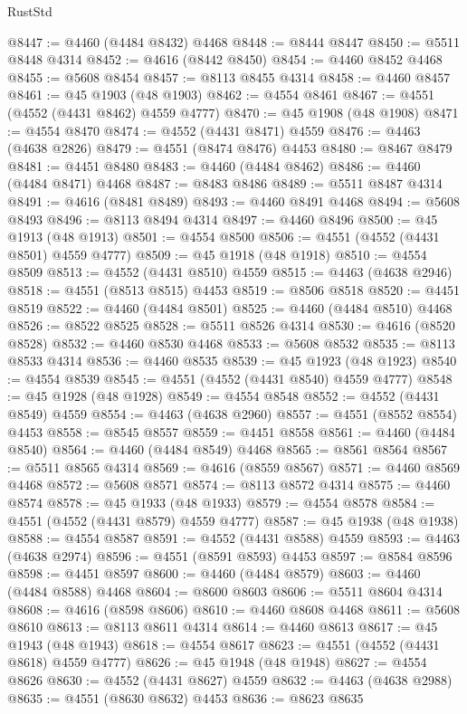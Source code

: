 \begin{lexlean}{RustStd}
\begin{coremodule}
@8447 := @4460 (@4484 @8432) @4468
@8448 := @8444 @8447
@8450 := @5511 @8448 @4314
@8452 := @4616 (@8442 @8450)
@8454 := @4460 @8452 @4468
@8455 := @5608 @8454
@8457 := @8113 @8455 @4314
@8458 := @4460 @8457
@8461 := @45 @1903 (@48 @1903)
@8462 := @4554 @8461
@8467 := @4551 (@4552 (@4431 @8462) @4559 @4777)
@8470 := @45 @1908 (@48 @1908)
@8471 := @4554 @8470
@8474 := @4552 (@4431 @8471) @4559
@8476 := @4463 (@4638 @2826)
@8479 := @4551 (@8474 @8476) @4453
@8480 := @8467 @8479
@8481 := @4451 @8480
@8483 := @4460 (@4484 @8462)
@8486 := @4460 (@4484 @8471) @4468
@8487 := @8483 @8486
@8489 := @5511 @8487 @4314
@8491 := @4616 (@8481 @8489)
@8493 := @4460 @8491 @4468
@8494 := @5608 @8493
@8496 := @8113 @8494 @4314
@8497 := @4460 @8496
@8500 := @45 @1913 (@48 @1913)
@8501 := @4554 @8500
@8506 := @4551 (@4552 (@4431 @8501) @4559 @4777)
@8509 := @45 @1918 (@48 @1918)
@8510 := @4554 @8509
@8513 := @4552 (@4431 @8510) @4559
@8515 := @4463 (@4638 @2946)
@8518 := @4551 (@8513 @8515) @4453
@8519 := @8506 @8518
@8520 := @4451 @8519
@8522 := @4460 (@4484 @8501)
@8525 := @4460 (@4484 @8510) @4468
@8526 := @8522 @8525
@8528 := @5511 @8526 @4314
@8530 := @4616 (@8520 @8528)
@8532 := @4460 @8530 @4468
@8533 := @5608 @8532
@8535 := @8113 @8533 @4314
@8536 := @4460 @8535
@8539 := @45 @1923 (@48 @1923)
@8540 := @4554 @8539
@8545 := @4551 (@4552 (@4431 @8540) @4559 @4777)
@8548 := @45 @1928 (@48 @1928)
@8549 := @4554 @8548
@8552 := @4552 (@4431 @8549) @4559
@8554 := @4463 (@4638 @2960)
@8557 := @4551 (@8552 @8554) @4453
@8558 := @8545 @8557
@8559 := @4451 @8558
@8561 := @4460 (@4484 @8540)
@8564 := @4460 (@4484 @8549) @4468
@8565 := @8561 @8564
@8567 := @5511 @8565 @4314
@8569 := @4616 (@8559 @8567)
@8571 := @4460 @8569 @4468
@8572 := @5608 @8571
@8574 := @8113 @8572 @4314
@8575 := @4460 @8574
@8578 := @45 @1933 (@48 @1933)
@8579 := @4554 @8578
@8584 := @4551 (@4552 (@4431 @8579) @4559 @4777)
@8587 := @45 @1938 (@48 @1938)
@8588 := @4554 @8587
@8591 := @4552 (@4431 @8588) @4559
@8593 := @4463 (@4638 @2974)
@8596 := @4551 (@8591 @8593) @4453
@8597 := @8584 @8596
@8598 := @4451 @8597
@8600 := @4460 (@4484 @8579)
@8603 := @4460 (@4484 @8588) @4468
@8604 := @8600 @8603
@8606 := @5511 @8604 @4314
@8608 := @4616 (@8598 @8606)
@8610 := @4460 @8608 @4468
@8611 := @5608 @8610
@8613 := @8113 @8611 @4314
@8614 := @4460 @8613
@8617 := @45 @1943 (@48 @1943)
@8618 := @4554 @8617
@8623 := @4551 (@4552 (@4431 @8618) @4559 @4777)
@8626 := @45 @1948 (@48 @1948)
@8627 := @4554 @8626
@8630 := @4552 (@4431 @8627) @4559
@8632 := @4463 (@4638 @2988)
@8635 := @4551 (@8630 @8632) @4453
@8636 := @8623 @8635

\end{coremodule}
\end{lexlean}

